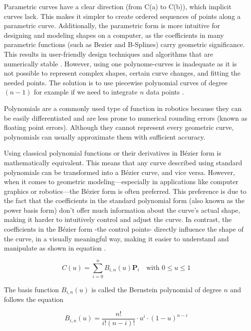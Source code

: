 Parametric curves have a clear direction (from C(a) to C(b)), which implicit curves lack. This makes 
it simpler to create ordered sequences of points along a parametric curve. Additionally, the parametric 
form is more intuitive for designing and modeling shapes on a computer, as the coefficients in many 
parametric functions (such as Bezier and B-Splines) carry geometric significance. This results in 
user-friendly design techniques and algorithms that are numerically stable \cite{R28}. 
However, using one polynome-curves is inadequate as it is not possible to represent complex shapes, certain 
curve changes, and fitting the needed points. 
The solution is to use piecewise polynomial curves of degree \((n-1)\) for example if we need to integrate
\(n\) data points \cite{R29}.

Polynomials are a commonly used type of function in robotics because they can be easily differentiated 
and are less prone to numerical rounding errors (known as floating point errors). Although they cannot 
represent every geometric curve, polynomials can usually approximate them with sufficient accuracy. 

Using classical polynomial functions or their derivatives in Bézier form is mathematically equivalent. 
This means that any curve described using standard polynomials can be transformed into a Bézier curve, 
and vice versa. However, when it comes to geometric modeling—especially in applications like computer 
graphics or robotics—the Bézier form is often preferred. This preference is due to the fact that the 
coefficients in the standard polynomial form (also known as the power basis form) don't offer much 
information about the curve's actual shape, making it harder to intuitively control and adjust the 
curve. In contrast, the coefficients in the Bézier form -the control points- directly influence the 
shape of the curve, in a visually meaningful way, making it easier to understand and manipulate 
as shown in equation  \cite{R28}. 

\begin{equation}
    C(u) = \sum_{i=0}^{n} B_{i,n}(u) \mathbf{P}_i \quad \text{with } 0 \leq u \leq 1 \label{Bezier curve}
\end{equation}

The basis function \( B_{i,n}(u) \) is called the Bernstein polynomial of degree \( n \) and follows the equation

\begin{equation}
    B_{i,n}(u) = \frac{n!}{i!(n - i)!} \cdot u^i \cdot (1 - u)^{n - i} \label{}
\end{equation}

